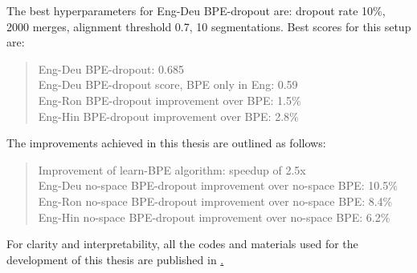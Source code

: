 The best hyperparameters for Eng-Deu BPE-dropout are: dropout rate 10\%, 2000 merges, alignment threshold 0.7, 10 segmentations. Best scores for this setup are:

\begin{quote}
    Eng-Deu BPE-dropout: 0.685\\
    Eng-Deu BPE-dropout score, BPE only in Eng: 0.59\\
    Eng-Ron BPE-dropout improvement over BPE: 1.5\%\\
    Eng-Hin BPE-dropout improvement over BPE: 2.8\%
\end{quote}

The improvements achieved in this thesis are outlined as follows:

\begin{quote}
    Improvement of learn-BPE algorithm: speedup of 2.5x\\
    Eng-Deu no-space BPE-dropout improvement over no-space BPE: 10.5\%\\
    Eng-Ron no-space BPE-dropout improvement over no-space BPE: 8.4\%\\
    Eng-Hin no-space BPE-dropout improvement over no-space BPE: 6.2\%\\
\end{quote}

For clarity and interpretability, all the codes and materials used for the development of this thesis are published in \href{https://github.com/anebz/thesis/}.
